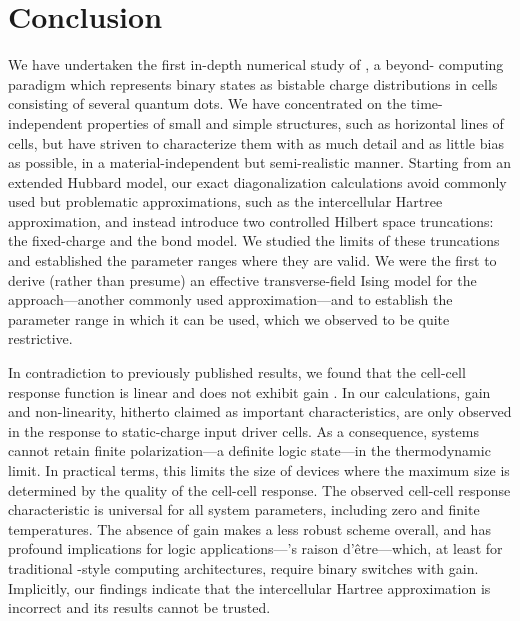\chapter{Conclusion}

We have undertaken the first in-depth numerical study of , a
beyond- computing paradigm which represents binary states as bistable
charge distributions in cells consisting of several quantum dots. We have
concentrated on the time-independent properties of small and simple structures,
such as horizontal lines of cells, but have striven to characterize them with as
much detail and as little bias as possible, in a material-independent but
semi-realistic manner. Starting from an extended Hubbard model, our exact
diagonalization calculations avoid commonly used but problematic approximations,
such as the intercellular Hartree approximation, and instead introduce two
controlled Hilbert space truncations: the fixed-charge and the bond model. We
studied the limits of these truncations and established the parameter ranges
where they are valid. We were the first to derive (rather than presume) an
effective transverse-field Ising model for the  approach---another
commonly used approximation---and to establish the parameter range in which it
can be used, which we observed to be quite restrictive.

In contradiction to previously published results, we found that the cell-cell
response function is linear and does not exhibit gain \cite{ritter2014}. In our
calculations, gain and non-linearity, hitherto claimed as important 
characteristics, are only observed in the response to static-charge input driver
cells. As a consequence,  systems cannot retain finite
polarization---a definite logic state---in the thermodynamic limit. In practical
terms, this limits the size of  devices where the maximum size is
determined by the quality of the cell-cell response. The observed cell-cell
response characteristic is universal for all system parameters, including zero
and finite temperatures. The absence of gain makes  a less robust
scheme overall, and has profound implications for logic
applications---'s raison d'\^etre---which, at least for traditional
-style computing architectures, require binary switches with gain.
Implicitly, our findings indicate that the intercellular Hartree approximation
is incorrect and its results cannot be trusted.

